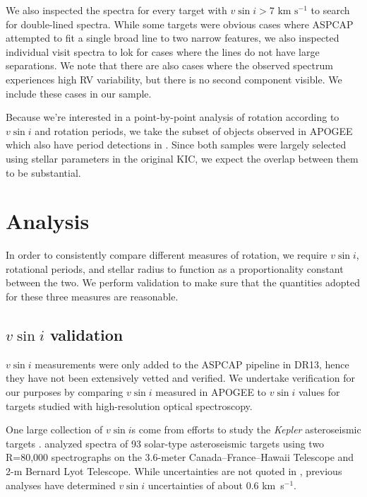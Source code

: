 \documentclass[manuscript]{aastex6}
\newcommand{\vsini}{\ensuremath{v \sin i}}
\newcommand{\Kepler}{\mbox{\textit{Kepler}}}
\newcommand{\kms}{\textrm{ km~s}\ensuremath{^{-1}}}
\newcommand{\gvs}{\authorcomment1}
\begin{document}
We also inspected the spectra for every target with \(\vsini > 7 \kms\)
to search for double-lined spectra. While some targets were obvious
cases where ASPCAP attempted to fit a single broad line to two narrow
features, we also inspected individual visit spectra to lok for cases
where the lines do not have large separations. We note that there are
also cases where the observed spectrum experiences high RV variability,
but there is no second component visible. We include these cases in our
sample.

Because we're interested in a point-by-point analysis of rotation according to
\vsini{} and rotation periods, we take the subset of \gvs{around 550} objects
observed in APOGEE which also have period detections in \citet{McQuillan14}.
Since both samples were largely selected using stellar parameters in the
original KIC, we expect the overlap between them to be substantial.



\section{Analysis}
\label{sec:analysis}

In order to consistently compare different measures of rotation, we require 
\vsini{}, rotational periods, and stellar radius to function as a 
proportionality constant
between the two. We perform validation to make sure that the quantities adopted
for these three measures are reasonable.


\subsection{\vsini{} validation}

\vsini{} measurements were only added to the ASPCAP pipeline in DR13, hence
they have not been extensively vetted and verified. We undertake 
verification for our purposes by comparing \vsini{} measured in APOGEE to \vsini{} values for
targets studied with high-resolution optical spectroscopy. 

One large collection of \vsini{}s come from efforts to study the
\Kepler{} asteroseismic targets \citep{Bruntt12}. \citet{Bruntt12} analyzed 
spectra of 93 solar-type asteroseismic targets using two R=80,000 spectrographs 
on the 3.6-meter Canada--France--Hawaii Telescope and 2-m Bernard Lyot
Telescope. While uncertainties are not quoted in \citet{Bruntt12},
previous analyses have determined \vsini{} uncertainties of about 0.6
\kms \citep{Bruntt10a,Bruntt10b}.
\end{document}
